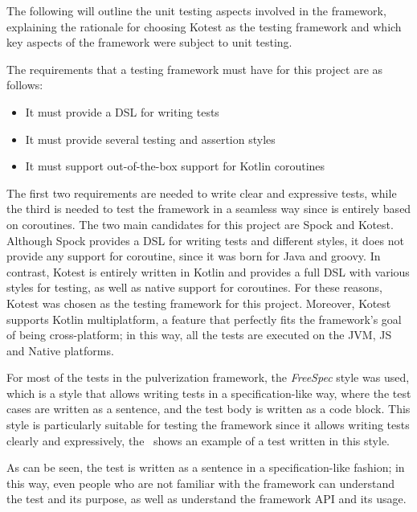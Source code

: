 The following will outline the unit testing aspects involved in the framework, explaining the rationale for choosing Kotest as the testing framework
and which key aspects of the framework were subject to unit testing.

The requirements that a testing framework must have for this project are as follows:
\begin{itemize}
	\item It must provide a DSL for writing tests
	\item It must provide several testing and assertion styles
	\item It must support out-of-the-box support for Kotlin coroutines
\end{itemize}

The first two requirements are needed to write clear and expressive tests, while the third is needed to test the framework in a seamless way since
is entirely based on coroutines.
The two main candidates for this project are Spock and Kotest. Although Spock provides a DSL for writing tests and different styles, it does not
provide any support for coroutine, since it was born for Java and groovy. In contrast, Kotest is entirely written in Kotlin and provides a full DSL
with various styles for testing, as well as native support for coroutines.
For these reasons, Kotest was chosen as the testing framework for this project. Moreover, Kotest supports Kotlin multiplatform, a feature that
perfectly fits the framework's goal of being cross-platform; in this way, all the tests are executed on the JVM, JS and Native platforms.

For most of the tests in the pulverization framework, the \emph{FreeSpec} style was used, which is a style that allows writing tests in a
specification-like way, where the test cases are written as a sentence, and the test body is written as a code block.
This style is particularly suitable for testing the framework since it allows writing tests clearly and expressively, the~ shows
an example of a test written in this style.

As can be seen, the test is written as a sentence in a specification-like fashion; in this way, even people who are not familiar with the framework
can understand the test and its purpose, as well as understand the framework API and its usage.



